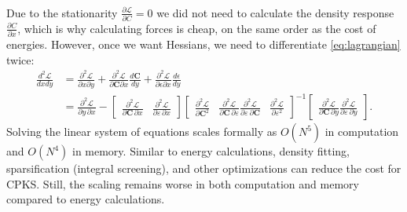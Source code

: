 \documentclass[pdflatex,sn-mathphys-num]{sn-jnl}%
\theoremstyle{thmstyleone}%
\theoremstyle{thmstyletwo}%
\theoremstyle{thmstylethree}%
\begin{document}
\begin{appendices}
\begin{align}
\end{align}
Due to the stationarity $\frac{\partial \mathcal{L}}{\partial C} = 0$ we did not need to calculate the density response $\frac{\partial C}{\partial x}$, which is why calculating forces is cheap, on the same order as the cost of energies. However, once we want Hessians, we need to differentiate \eqref{eq:lagrangian} twice:
\begin{align}
    \frac{d^2 \mathcal{L}}{dx dy} &= \frac{\partial^2 \mathcal{L}}{\partial x \partial y} + \frac{\partial^2 \mathcal{L}}{\partial \mathbf{C} \partial x} \frac{d \mathbf{C}}{d y} + \frac{\partial^2 \mathcal{L}}{\partial \epsilon \partial x}\frac{d \epsilon}{dy} \\
    &=  \frac{\partial^2 \mathcal L}{\partial y\,\partial x}
-\begin{bmatrix}
\displaystyle \frac{\partial^2 \mathcal L}{\partial \mathbf{C}\,\partial x} &
\displaystyle \frac{\partial^2 \mathcal L}{\partial \varepsilon\,\partial x}
\end{bmatrix}
\begin{bmatrix}
\displaystyle \frac{\partial^2 \mathcal L}{\partial \mathbf{C}^2} & \displaystyle \frac{\partial^2 \mathcal L}{\partial \mathbf{C}\,\partial \varepsilon} 
\displaystyle \frac{\partial^2 \mathcal L}{\partial \varepsilon\,\partial \mathbf{C}} & \displaystyle \frac{\partial^2 \mathcal L}{\partial \varepsilon^2}
\end{bmatrix}^{-1}
\begin{bmatrix}
\displaystyle \frac{\partial^2 \mathcal L}{\partial \mathbf{C}\,\partial y} 
\displaystyle \frac{\partial^2 \mathcal L}{\partial \varepsilon\,\partial y}
\end{bmatrix}.
\end{align}
Solving the linear system of equations scales formally as $O(N^5)$ in computation and $O(N^4)$ in memory. Similar to energy calculations, density fitting, sparsification (integral screening), and other optimizations can reduce the cost for CPKS. Still, the scaling remains worse in both computation and memory compared to energy calculations. 


\end{appendices}
\end{document}
